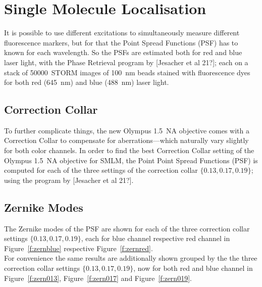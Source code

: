\documentclass[11pt, a4paper, oneside, twocolumn]{report}
\renewcommand{\t}{\todo}
\begin{document}
\section{Single Molecule Localisation}

It is possible to use different excitations to simultaneously measure
different fluorescence markers, but for that the Point Spread
Functions (PSF) has to known for each wavelength. So the PSFs are
estimated both for red and blue laser light, with the Phase Retrieval
program by [Jesacher et al 21?]; each on a stack of 50000~STORM images
of \SI{100}{\nm} \t{100nm?} beads stained with fluorescence dyes for
both red (\SI{645}{\nm}) and blue (\SI{488}{\nm}) laser light.\\


\subsection{Correction Collar}

To further complicate things, the new Olympus 1.5~NA objective comes
with a Correction Collar to compensate for aberrations---which
naturally vary slightly for both color channels. In order to find the
best Correction Collar setting of the Olympus 1.5~NA objective for
SMLM, the Point Point Spread Functions (PSF) is computed for each of
the three settings of the correction collar $\{0.13,0.17,0.19\}$;
using the program by [Jesacher et al 21?].\\


\subsection{Zernike Modes}

The Zernike modes of the PSF are shown for each of the three
correction collar settings $\{0.13,0.17,0.19\}$, each for blue channel
respective red channel in Figure~\ref{f:zernblue} respective
Figure~\ref{f:zernred}.\\

For convenience the same results are additionally shown grouped by the
the three correction collar settings $\{0.13,0.17,0.19\}$, now for
both red and blue channel in Figure~\ref{f:zern013},
Figure~\ref{f:zern017} and Figure~\ref{f:zern019}.\\
\end{document}
